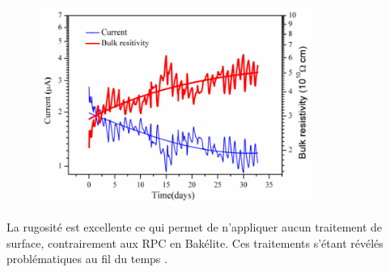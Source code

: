 \begin{figure}[ht!]
	\centering
	\includegraphics[width=0.80\textwidth]{GLA/resi.png}
	\label{resi}
\end{figure}

La rugosité est excellente ce qui permet de n'appliquer aucun traitement de surface, contrairement aux RPC en Bakélite. Ces traitements s'étant révélés problématiques au fil du temps \cite{1352718}.

